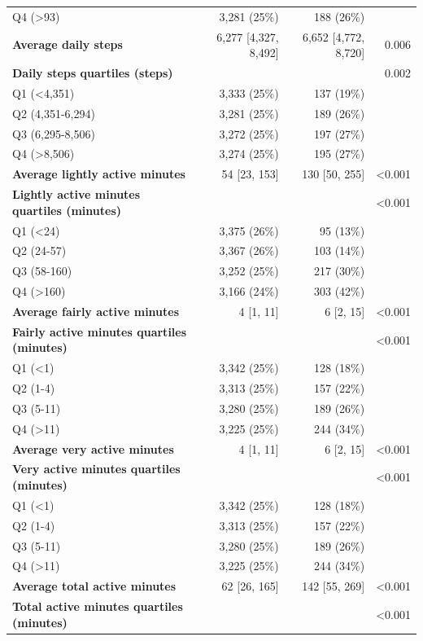 \documentclass[11pt]{article}
\begin{document}
\begin{longtable}{@{}p{6.4cm}rrr@{}}
\quad Q4 (>93) & 3,281 (25\%) & 188 (26\%) &  \\
\textbf{Average daily steps} & 6,277 [4,327, 8,492] & 6,652 [4,772, 8,720] & 0.006 \\
\textbf{Daily steps quartiles (steps)} &  &  & 0.002 \\
\quad Q1 (<4,351) & 3,333 (25\%) & 137 (19\%) &  \\
\quad Q2 (4,351-6,294) & 3,281 (25\%) & 189 (26\%) &  \\
\quad Q3 (6,295-8,506) & 3,272 (25\%) & 197 (27\%) &  \\
\quad Q4 (>8,506) & 3,274 (25\%) & 195 (27\%) &  \\
\textbf{Average lightly active minutes} & 54 [23, 153] & 130 [50, 255] & <0.001 \\
\textbf{Lightly active minutes quartiles (minutes)} &  &  & <0.001 \\
\quad Q1 (<24) & 3,375 (26\%) & 95 (13\%) &  \\
\quad Q2 (24-57) & 3,367 (26\%) & 103 (14\%) &  \\
\quad Q3 (58-160) & 3,252 (25\%) & 217 (30\%) &  \\
\quad Q4 (>160) & 3,166 (24\%) & 303 (42\%) &  \\
\textbf{Average fairly active minutes} & 4 [1, 11] & 6 [2, 15] & <0.001 \\
\textbf{Fairly active minutes quartiles (minutes)} &  &  & <0.001 \\
\quad Q1 (<1) & 3,342 (25\%) & 128 (18\%) &  \\
\quad Q2 (1-4) & 3,313 (25\%) & 157 (22\%) &  \\
\quad Q3 (5-11) & 3,280 (25\%) & 189 (26\%) &  \\
\quad Q4 (>11) & 3,225 (25\%) & 244 (34\%) &  \\
\textbf{Average very active minutes} & 4 [1, 11] & 6 [2, 15] & <0.001 \\
\textbf{Very active minutes quartiles (minutes)} &  &  & <0.001 \\
\quad Q1 (<1) & 3,342 (25\%) & 128 (18\%) &  \\
\quad Q2 (1-4) & 3,313 (25\%) & 157 (22\%) &  \\
\quad Q3 (5-11) & 3,280 (25\%) & 189 (26\%) &  \\
\quad Q4 (>11) & 3,225 (25\%) & 244 (34\%) &  \\
\textbf{Average total active minutes} & 62 [26, 165] & 142 [55, 269] & <0.001 \\
\textbf{Total active minutes quartiles (minutes)} &  &  & <0.001 \\

\end{longtable}
\end{document}
